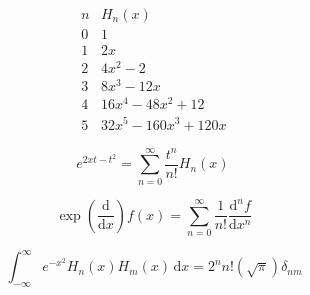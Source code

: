 \[\begin{equation} \label{hermvals} {\begin{array}{r|r}n&H_{n}(x)\\\hline 0&1\\1&2x\\2&4x^{2}-2\\3&8x^{3}-12x\\4&16x^{4}-48x^{2}+12\\5&32x^5-160x^3+120x \end{array}} \end{equation}\]

\[\begin{equation} \label{thrm5.1} e^{2xt-t^{2}}=\sum _{n=0}^{\infty }{\frac {t^{n}}{n!}}H_n(x)\,\! \end{equation}\]

\[\begin{equation} \label{thrm5.3(ii)} \exp{(\frac{\mathrm{d}}{\mathrm{d}x})}f(x) = \sum_{n=0}^{\infty}\frac{1}{n!}\frac{\mathrm{d}^nf}{\mathrm{d}x^n} \end{equation}\]

\[\begin{equation} \label{thrm5.5} \int _{-\infty }^{\infty }e^{-x^2}H_{n}(x)H_{m}(x)\,\mathrm {d} x=2^{n}n!(\sqrt{\pi})\delta _{nm} \end{equation}\]

